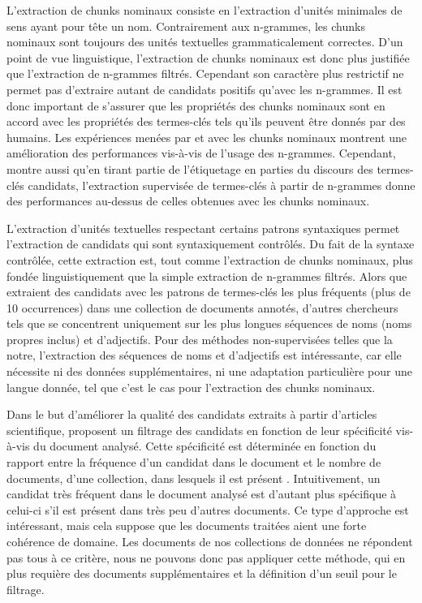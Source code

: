     L'extraction de chunks nominaux consiste en l'extraction d'unités
    minimales de sens ayant pour tête un nom. Contrairement aux n-grammes, les
    chunks nominaux sont toujours des unités textuelles grammaticalement
    correctes. D'un point de vue linguistique, l'extraction de chunks nominaux
    est donc plus justifiée que l'extraction de n-grammes filtrés. Cependant
    son caractère plus restrictif ne permet pas d'extraire autant de candidats
    positifs qu'avec les n-grammes. Il est donc important de s'assurer que les
    propriétés des chunks nominaux sont en accord avec les propriétés des
    termes-clés tels qu'ils peuvent être donnés par des humains. Les expériences
    menées par  et
     avec les chunks nominaux montrent une
    amélioration des performances vis-à-vis de l'usage des n-grammes.
    Cependant,  montre aussi qu'en tirant
    partie de l'étiquetage en parties du discours des termes-clés candidats,
    l'extraction supervisée de termes-clés à partir de n-grammes donne des
    performances au-dessus de celles obtenues avec les chunks nominaux.

    L'extraction d'unités textuelles respectant certains patrons syntaxiques
    permet l'extraction de candidats qui sont syntaxiquement
    contrôlés. Du fait de la syntaxe contrôlée, cette extraction est, tout comme
    l'extraction de chunks nominaux, plus fondée linguistiquement
    que la simple extraction de n-grammes filtrés. Alors que
     extraient des candidats avec les
    patrons de termes-clés les plus fréquents (plus de 10 occurrences) dans une
    collection de documents annotés, d'autres chercheurs tels que
     se concentrent uniquement sur les plus longues
    séquences de noms (noms propres inclus) et d'adjectifs. Pour des méthodes
    non-supervisées telles que la notre, l'extraction des séquences de noms et
    d'adjectifs est intéressante, car elle nécessite ni des données
    supplémentaires, ni une adaptation particulière pour une langue donnée,
    tel que c'est le cas pour l'extraction des chunks nominaux.

    Dans le but d'améliorer la qualité des candidats extraits à partir
    d'articles scientifique,  proposent un
    filtrage des candidats en fonction de leur spécificité vis-à-vis du document
    analysé. Cette spécificité est déterminée en fonction du rapport entre la
    fréquence d'un candidat dans le document et le nombre de documents, d'une
    collection, dans lesquels il est présent \cite[TF-IDF]{jones1972tfidf}.
    Intuitivement, un candidat très fréquent dans le document analysé est
    d'autant plus spécifique à celui-ci s'il est présent dans très peu d'autres
    documents. Ce type d'approche est intéressant, mais cela suppose que les
    documents traitées aient une forte cohérence de domaine. Les documents de
    nos collections de données ne répondent pas tous à ce critère, nous ne
    pouvons donc pas appliquer cette méthode, qui en plus requière des documents
    supplémentaires et la définition d'un seuil pour le filtrage.

